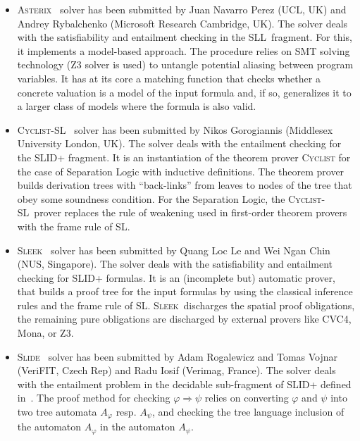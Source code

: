 \documentclass[twoside,11pt]{article}
\newcommand{\limp}{\Rightarrow}
\newcommand{\SLRD}{\textsc{SLID}}
\newcommand{\SLL}{\textsc{SLL}}
\newcommand{\ASTERIX}{\textsc{Asterix}}
\newcommand{\CYCLIST}{\textsc{Cyclist-SL}}
\newcommand{\SLEEK}{\textsc{Sleek}}
\newcommand{\SLIDE}{\textsc{Slide}}
\begin{document}
\begin{itemize}
\item \ASTERIX~\cite{PerezR13} 
solver has been submitted by 
Juan Navarro Perez (UCL, UK) and 
Andrey Rybalchenko (Microsoft Research Cambridge, UK).
The solver deals with the satisfiability and entailment checking in the \SLL\ fragment.
For this, it implements a model-based approach.
The procedure relies on SMT solving technology (Z3 solver is used) to untangle potential aliasing between program variables. 
It has at its core a matching function that checks whether a concrete valuation is a model of the input formula and, if so, generalizes it to a larger class of models where the formula is also valid.  


\item \CYCLIST~\cite{BrotherstonGP12,CYCLISTsite}
solver has been submitted by 
Nikos Gorogiannis (Middlesex University London, UK).
The solver deals with the entailment checking for the \SLRD+ fragment.
It is an instantiation of the theorem prover \textsc{Cyclist} for the case of Separation Logic with inductive definitions. 
The theorem prover builds derivation trees with ``back-links'' from leaves to nodes of the tree that obey some soundness condition. 
For the Separation Logic, the \CYCLIST\ prover replaces the rule of weakening used in first-order theorem provers with the frame rule of SL.


\item \SLEEK~\cite{ChinDNQ12,SLEEKsite} 
solver has been submitted by 
Quang Loc Le and Wei Ngan Chin (NUS, Singapore).
The solver deals with the satisfiability and entailment checking for \SLRD+ formulas.
It is an (incomplete but) automatic prover, that builds a proof tree for the input formulas by using the classical inference rules and the frame rule of SL.
%
\SLEEK\ discharges the spatial proof obligations, the remaining pure obligations are discharged by external provers like CVC4, Mona, or Z3.


\item \SLIDE~\cite{IosifRV14,SLIDEsite} 
solver has been submitted by 
Adam Rogalewicz and Tomas Vojnar (VeriFIT, Czech Rep) and
Radu Iosif (Verimag, France).
The solver deals with the entailment problem in the decidable sub-fragment of \SLRD+ defined in~\cite{IosifRS13}.
The proof method for checking $\varphi\limp\psi$ relies on converting $\varphi$ and $\psi$ into two tree automata $A_\varphi$ resp. $A_\psi$, and checking
the tree language inclusion of the automaton $A_\varphi$ in the automaton $A_\psi$.



\end{itemize}
\end{document}
